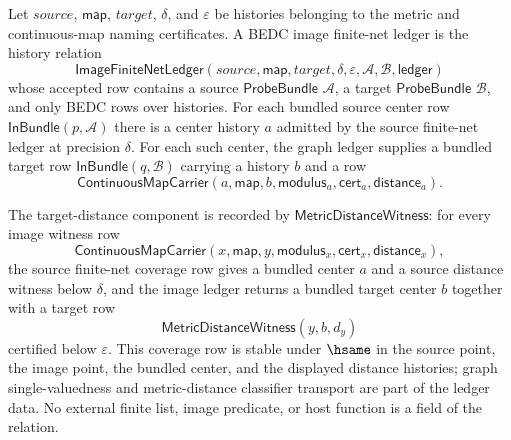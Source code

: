 \begin{definition}
\label{def:compact-image-finite-net-ledger}
Let $source$, $\mathsf{map}$, $target$, $\delta$, and $\varepsilon$ be histories
belonging to the metric and continuous-map naming certificates. A BEDC image
finite-net ledger is the history relation
$$
\mathsf{ImageFiniteNetLedger}(source,\mathsf{map},target,\delta,\varepsilon,
\mathcal{A},\mathcal{B},\mathsf{ledger})
$$
whose accepted row contains a source $\mathsf{ProbeBundle}$ $\mathcal{A}$, a
target $\mathsf{ProbeBundle}$ $\mathcal{B}$, and only BEDC rows over histories.
For each bundled source center row $\mathsf{InBundle}(p,\mathcal{A})$ there is
a center history $a$ admitted by the source finite-net ledger at precision
$\delta$. For each such center, the graph ledger supplies a bundled target row
$\mathsf{InBundle}(q,\mathcal{B})$ carrying a history $b$ and a row
$$
\mathsf{ContinuousMapCarrier}(a,\mathsf{map},b,\mathsf{modulus}_a,
\mathsf{cert}_a,\mathsf{distance}_a).
$$

The target-distance component is recorded by $\mathsf{MetricDistanceWitness}$:
for every image witness row
$$
\mathsf{ContinuousMapCarrier}(x,\mathsf{map},y,\mathsf{modulus}_x,
\mathsf{cert}_x,\mathsf{distance}_x),
$$
the source finite-net coverage row gives a bundled center $a$ and a source
distance witness below $\delta$, and the image ledger returns a bundled target
center $b$ together with a target row
$$
\mathsf{MetricDistanceWitness}(y,b,d_y)
$$
certified below $\varepsilon$. This coverage row is stable under $\hsame$ in
the source point, the image point, the bundled center, and the displayed
distance histories; graph single-valuedness and metric-distance classifier
transport are part of the ledger data. No external finite list, image predicate,
or host function is a field of the relation.
\end{definition}

